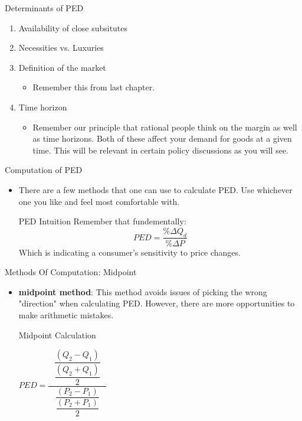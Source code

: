 \documentclass[aspectratio=169]{beamer}
\begin{document}
\begin{frame}{Determinants of PED}
    \begin{enumerate}
        \item<1-> Availability of close subsitutes
        \item <2-> Necessities vs. Luxuries
        \item <3-> Definition of the market
            \begin{itemize}
            \item Remember this from last chapter.
        \end{itemize}
        \item<4-> Time horizon
            \begin{itemize}
                \item Remember our principle that rational people think on the margin as well as time horizons. Both of these affect your demand for goods at a given time. This will be relevant in certain policy discussions as you will see.
            \end{itemize}
    \end{enumerate}
\end{frame}

\begin{frame}{Computation of PED}
    \begin{itemize}
        \item There are a few methods that one can use to calculate PED. Use whichever one you like and feel most comfortable with.
        \vspace{5mm}
        \begin{block}{PED Intuition}
            Remember that fundementally:
            \[
             PED = \frac{\% \Delta Q_d}{\% \Delta P}
            \]
            Which is indicating a consumer's sensitivity to price changes.
        \end{block}
    \end{itemize}
\end{frame}

\begin{frame}{Methods Of Computation: Midpoint}
    \begin{itemize}
    \item\textbf{midpoint method}: This method avoids issues of picking the wrong "direction" when calculating PED. However, there are more opportunities to make arithmetic mistakes.
        \begin{block}{Midpoint Calculation}
        \begin{center}
            $
            PED = \dfrac{~~~\dfrac{(Q_2 - Q_1)}{\dfrac{(Q_2 + Q_1)}{2}}~~~}{\dfrac{(P_2 - P_1)}{\dfrac{(P_2 + P_1)}{2}}}
            $
        \end{center}
       \end{block}
    \end{itemize}
    
\end{frame}
\end{document}
